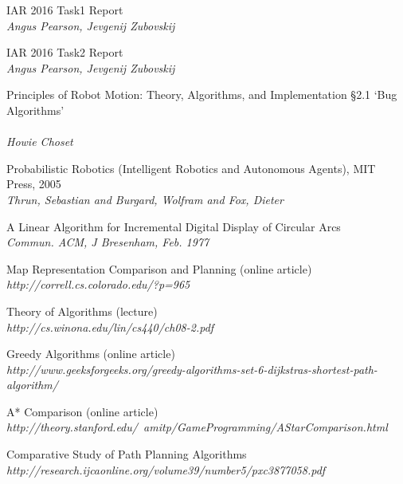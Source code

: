 \documentclass[11pt, a4paper]{article}
\begin{document}
\newpage
\begin{thebibliography}{}

\par{IAR 2016 Task1 Report}
\\
\textit{Angus Pearson, Jevgenij Zubovskij}

\par{IAR 2016 Task2 Report}
\\
\textit{Angus Pearson, Jevgenij Zubovskij}


\par{Principles of Robot Motion: Theory, Algorithms, and Implementation \S2.1 `Bug Algorithms'}\\
\\
\textit{Howie Choset}


\par{Probabilistic Robotics (Intelligent Robotics and Autonomous Agents), MIT Press, 2005}
\\
\textit{Thrun, Sebastian and Burgard, Wolfram and Fox, Dieter}

\par{A Linear Algorithm for Incremental Digital Display of Circular Arcs}
\\
\textit{Commun. ACM, J Bresenham, Feb. 1977}

\par{Map Representation Comparison and Planning (online article)}
\\
\textit{http://correll.cs.colorado.edu/?p=965}



\par{Theory of Algorithms (lecture)}
\\
\textit{http://cs.winona.edu/lin/cs440/ch08-2.pdf}

\par{Greedy Algorithms (online article)}
\\
\textit{http://www.geeksforgeeks.org/greedy-algorithms-set-6-dijkstras-shortest-path-algorithm/}

\par{A* Comparison (online article)}
\\
\textit{http://theory.stanford.edu/~amitp/GameProgramming/AStarComparison.html}

\par{Comparative Study of Path Planning Algorithms}
\\
\textit{http://research.ijcaonline.org/volume39/number5/pxc3877058.pdf}


\end{thebibliography}
\end{document}
